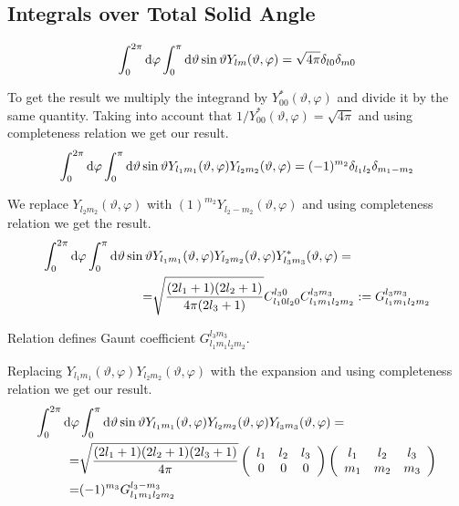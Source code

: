 \subsection{Integrals over Total Solid Angle}
\begin{equation}
\int_{0}^{2\pi}\text{d} \varphi\int_{0}^{\pi}\text{d} \vartheta \sin \vartheta Y_{lm}(\vartheta,\varphi)=\sqrt{4\pi}\delta_{l0}\delta_{m0}
\end{equation}
\par{To get the result we multiply the integrand by $Y_{00}^{*}(\vartheta,\varphi)$ and
divide it by the same quantity. Taking into account that
$1/Y_{00}^{*}(\vartheta,\varphi)=\sqrt{4\pi}$ and using completeness relation
we get our result.}
\begin{equation}
\int_{0}^{2\pi}\text{d} \varphi\int_{0}^{\pi}\text{d} \vartheta \sin \vartheta Y_{l_1m_1}(\vartheta,\varphi)Y_{l_2m_2}(\vartheta,\varphi)=(-1)^{m_2}\delta_{l_1l_2}\delta_{m_1-m_2}
\end{equation}
\par{We replace $Y_{l_2m_2}(\vartheta,\varphi)$ with
$(1)^{m_2}Y_{l_2-m_2}(\vartheta,\varphi)$ and using completeness relation we
get the result.}
%
\begin{equation}
\label{gauntdef}
\begin{split}
\int_{0}^{2\pi}\td \varphi\int_{0}^{\pi}\td \vartheta \sin \vartheta
&Y_{l_1m_1}(\vartheta,\varphi)Y_{l_2m_2}(\vartheta,\varphi)Y_{l_3m_3}^{*}(\vartheta,\varphi)=\\=&\sqrt{\frac{(2l_1+1)(2l_2+1)}{4\pi(2l_3+1)}} C_{l_10l_20}^{l_30}C_{l_1m_1l_2m_2}^{l_3m_3}
:=G_{l_1m_1l_2m_2}^{l_3m_3}
\end{split}
\end{equation}
\par{Relation  defines Gaunt coefficient $G_{l_1m_1l_2m_2}^{l_3m_3}$.}
\par{Replacing $Y_{l_1m_1}(\vartheta,\varphi)Y_{l_2m_2}(\vartheta,\varphi)$ with
the expansion  and using completeness relation we get our result.}
\begin{equation}
\label{yjm3}
\begin{split}
\int_{0}^{2\pi}\td \varphi&\int_{0}^{\pi}\td \vartheta \sin \vartheta
Y_{l_1m_1}(\vartheta,\varphi)Y_{l_2m_2}(\vartheta,\varphi)Y_{l_3m_3}(\vartheta,\varphi)=\\=&\sqrt{\frac{(2l_1+1)(2l_2+1)(2l_3+1)}{4\pi}}
\tjm{l_1}{0}{l_2}{0}{l_3}{0}\tjm{l_1}{m_1}{l_2}{m_2}{l_3}{m_3}\\=&(-1)^{m_3}G_{l_1m_1l_2m_2}^{l_3-m_3}
\end{split}
\end{equation}
